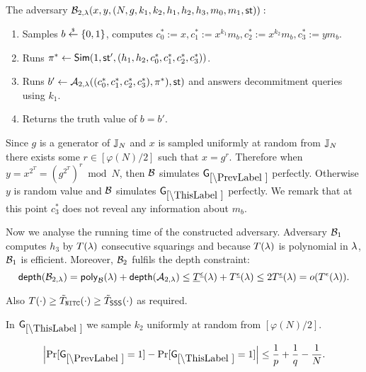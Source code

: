 The adversary $\mathcal{B}_{2,\lambda}(x,y,(N,g,k_1, k_2, h_1,h_2,h_3, m_0, m_1, \mathsf{st})):$
\vspace{-2mm}
\begin{enumerate}
\item Samples $b \stackrel{{\scriptscriptstyle\$}}{\leftarrow} \{0,1\}$, computes $c_0^*:=x, c_1^*:=x^{k_1} m_b, c_2^*:=x^{k_2}m_b, c_3^*:=y m_b$.
\item Runs $\pi^* \leftarrow \mathsf{Sim}(1, \mathsf{st}', (h_1, h_2, c_0^*, c_1^*, c_2^*, c_3^*))$.
\item Runs $b' \leftarrow \mathcal{A}_{2, \lambda}((c_0^*, c_1^*, c_2^*, c_3^*), \pi^*), \mathsf{st})$ and answers decommitment queries using $k_1$.
\item Returns the truth value of $b=b'$.
\end{enumerate}
Since $g$ is a generator of $\mathbb{J}_N$ and $x$ is sampled uniformly at random from $\mathbb{J}_N$ there exists some $r \in [\varphi(N)/2]$ such that $x = g^{r}$. Therefore when $y = x^{2^T} = (g^{2^T})^{r} \bmod N$, then $\mathcal{B}$ simulates $\games_\prevgame$ perfectly. Otherwise $y$ is random value and $\mathcal{B}$ simulates $\games_\thisgame$ perfectly. We remark that at this point $c_3^*$ does not reveal any information about $m_b$.

Now we analyse the running time of the constructed adversary. Adversary $\mathcal{B}_1$ computes $h_3$ by $T(\lambda)$ consecutive squarings and because $T(\lambda)$ is polynomial in $\lambda$, $\mathcal{B}_1$ is efficient. Moreover, $\mathcal{B}_2$ fulfils the depth constraint:
\[ \mathsf{depth}(\mathcal{B}_{2,\lambda}) = \mathsf{poly}_{\mathcal{B}}(\lambda) + \mathsf{depth}(\mathcal{A}_{2,\lambda}) \leq \underline{T}^{\underline{\epsilon}}(\lambda) + T^{\underline{\epsilon}}(\lambda) \leq 2 T^{\underline{\epsilon}}(\lambda) = o(T^{\epsilon}(\lambda)). \] 

Also $T(\cdot) \geq \tilde{T}_{\mathtt{NITC}}(\cdot) \geq \tilde{T}_\mathsf{SSS}(\cdot)$ as required.  

%


In $\games_\thisgame$ we sample $k_2$ uniformly at random from $[\varphi(N)/2]$. 

\begin{lemma}
\[
\left|\Pr[\games_\prevgame = 1] - \Pr[\games_\thisgame = 1]\right| \leq \frac{1}{p}+\frac{1}{q}-\frac{1}{N}.
\]
\end{lemma}

